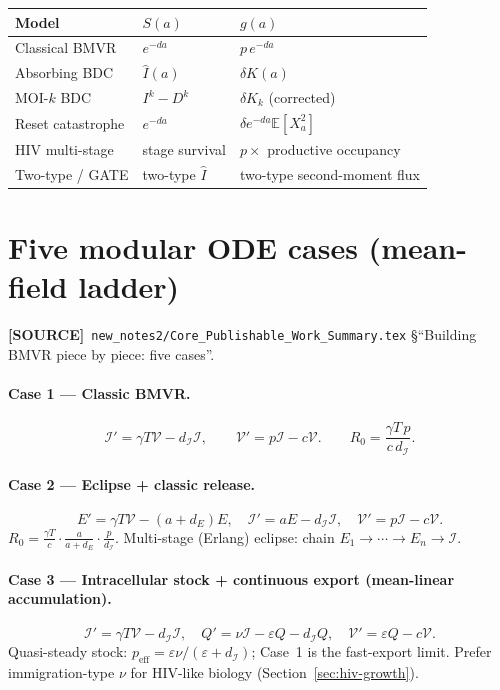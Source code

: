 \documentclass[11pt,a4paper]{article}
\newcommand{\E}{\mathbb{E}}
\newcommand{\Ihat}{\widehat{I}}
\newcommand{\Icell}{\mathcal{I}}
\newcommand{\Vfree}{\mathcal{V}}
\theoremstyle{plain}
\theoremstyle{definition}
\theoremstyle{remark}
\newcommand{\SOURCE}{\textcolor{gray!50!black}{\textbf{[SOURCE]}}}
\begin{document}
\begin{center}
\renewcommand{\arraystretch}{1.2}
\begin{tabular}{@{}lll@{}}
\toprule
Model & $S(a)$ & $g(a)$ \\
\midrule
Classical BMVR & $e^{-d a}$ & $p\,e^{-d a}$ \\
Absorbing BDC & $\Ihat(a)$ & $\delta K(a)$ \\
MOI-$k$ BDC & $I^k-D^k$ & $\delta K_k$ (corrected) \\
Reset catastrophe & $e^{-d a}$ & $\delta e^{-d a}\E[X_a^2]$ \\
HIV multi-stage & stage survival & $p\times$ productive occupancy \\
Two-type / GATE & two-type $\Ihat$ & two-type second-moment flux \\
\bottomrule
\end{tabular}
\end{center}

\section{Five modular ODE cases (mean-field ladder)}
\label{sec:cases}
\SOURCE\
\texttt{new\_notes2/Core\_Publishable\_Work\_Summary.tex}
\S``Building BMVR piece by piece: five cases''.

\paragraph{Case 1 --- Classic BMVR.}
\[
\Icell'=\gamma T\Vfree-d_{\Icell}\Icell,\qquad
\Vfree'=p\Icell-c\Vfree.
\qquad
R_0=\frac{\gamma T\,p}{c\,d_{\Icell}}.
\]

\paragraph{Case 2 --- Eclipse + classic release.}
\[
E'=\gamma T\Vfree-(a+d_E)E,\quad
\Icell'=aE-d_{\Icell}\Icell,\quad
\Vfree'=p\Icell-c\Vfree.
\]
$R_0=\frac{\gamma T}{c}\cdot\frac{a}{a+d_E}\cdot\frac{p}{d_{\Icell}}$.
Multi-stage (Erlang) eclipse: chain $E_1\to\cdots\to E_n\to\Icell$.

\paragraph{Case 3 --- Intracellular stock + continuous export
(mean-linear accumulation).}
\[
\Icell'=\gamma T\Vfree-d_{\Icell}\Icell,\quad
Q'=\nu\Icell-\varepsilon Q-d_{\Icell}Q,\quad
\Vfree'=\varepsilon Q-c\Vfree.
\]
Quasi-steady stock: $p_{\mathrm{eff}}=\varepsilon\nu/(\varepsilon+d_{\Icell})$;
Case~1 is the fast-export limit. Prefer immigration-type $\nu$ for HIV-like
biology (Section~\ref{sec:hiv-growth}).
\end{document}
